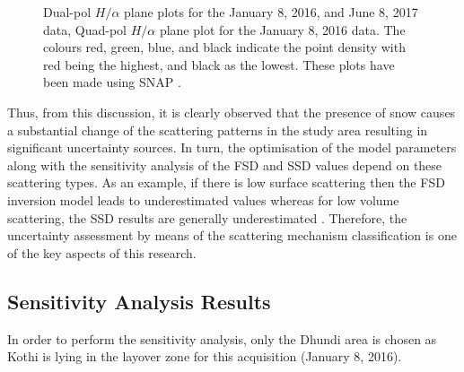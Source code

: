 \documentclass[review]{elsarticle}
\numberwithin{equation}{section}
\numberwithin{figure}{section}
\numberwithin{table}{section}
\begin{document}
\begin{figure}[htb]
\begin{subfigure}[t]{0.49\textwidth}
        \caption{}
        \label{subfig:ha_jan_quad}
    \end{subfigure}
    \caption{Dual-pol $H/{\alpha}$ plane plots for the  January 8, 2016, and  June 8, 2017 data,  Quad-pol $H/{\alpha}$ plane plot for the January 8, 2016 data. The colours red, green, blue, and black indicate the point density with red being the highest, and black as the lowest. These plots have been made using SNAP \citep{ESA2018}.}
    \label{fig:ha_res}
\end{figure}

Thus, from this discussion, it is clearly observed that the presence of snow causes a substantial change of the scattering patterns in the study area resulting in significant uncertainty sources. In turn, the optimisation of the model parameters along with the sensitivity analysis of the FSD and SSD values depend on these scattering types. As an example, if there is low surface scattering then the FSD inversion model leads to underestimated values \citep{Leinss2014} whereas for low volume scattering, the SSD results are generally underestimated \citep{Cloude2005, Hajnsek2009, Kugler2015}. Therefore, the uncertainty assessment by means of the scattering mechanism classification is one of the key aspects of this research.

\subsection{Sensitivity Analysis Results}
\label{ssec:sar}
In order to perform the sensitivity analysis, only the Dhundi area is chosen as Kothi is lying in the layover zone for this acquisition (January 8, 2016).
\end{document}
